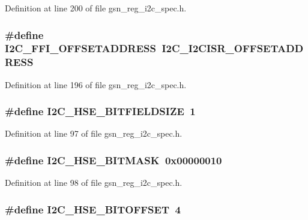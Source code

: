 Definition at line 200 of file gsn\_\-reg\_\-i2c\_\-spec.h.

\hypertarget{a00558_acad7fae52d1312ade243d8cf25820b5a}{
\subsubsection[{I2C\_\-FFI\_\-OFFSETADDRESS}]{\setlength{\rightskip}{0pt plus 5cm}\#define I2C\_\-FFI\_\-OFFSETADDRESS~I2C\_\-I2CISR\_\-OFFSETADDRESS}}
\label{a00558_acad7fae52d1312ade243d8cf25820b5a}


Definition at line 196 of file gsn\_\-reg\_\-i2c\_\-spec.h.

\hypertarget{a00558_a9cb5cd68d84649e9c4c1282f166ed884}{
\subsubsection[{I2C\_\-HSE\_\-BITFIELDSIZE}]{\setlength{\rightskip}{0pt plus 5cm}\#define I2C\_\-HSE\_\-BITFIELDSIZE~1}}
\label{a00558_a9cb5cd68d84649e9c4c1282f166ed884}


Definition at line 97 of file gsn\_\-reg\_\-i2c\_\-spec.h.

\hypertarget{a00558_a3bbd37beba21f6ed0274d3bbb8153eb7}{
\subsubsection[{I2C\_\-HSE\_\-BITMASK}]{\setlength{\rightskip}{0pt plus 5cm}\#define I2C\_\-HSE\_\-BITMASK~0x00000010}}
\label{a00558_a3bbd37beba21f6ed0274d3bbb8153eb7}


Definition at line 98 of file gsn\_\-reg\_\-i2c\_\-spec.h.

\hypertarget{a00558_acaf102d531786d1f4ae31649c5fbe717}{
\subsubsection[{I2C\_\-HSE\_\-BITOFFSET}]{\setlength{\rightskip}{0pt plus 5cm}\#define I2C\_\-HSE\_\-BITOFFSET~4}}
\label{a00558_acaf102d531786d1f4ae31649c5fbe717}


